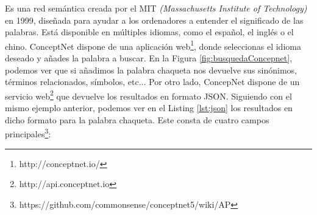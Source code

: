 Es una red semántica creada por el MIT \textit{(Massachusetts Institute of Technology)} en 1999, diseñada para ayudar a los ordenadores a entender el significado de las palabras. Está disponible en múltiples idiomas, como el español, el inglés o el chino. ConceptNet dispone de una aplicación web\footnote{http://conceptnet.io/}, donde seleccionas el idioma deseado y añades la palabra a buscar. En la Figura  \ref{fig:busquedaConcepnet}, podemos ver que si añadimos la palabra chaqueta nos devuelve sus sinónimos, términos relacionados, símbolos, etc...
Por otro lado, ConcepNet dispone de un servicio web\footnote{http://api.conceptnet.io} que devuelve los resultados en formato JSON. Siguiendo con el mismo ejemplo anterior, podemos ver en el Listing \ref{lst:json} los resultados en dicho formato para la palabra chaqueta. Este consta de cuatro campos principales\footnote{https://github.com/commonsense/conceptnet5/wiki/AP}:
